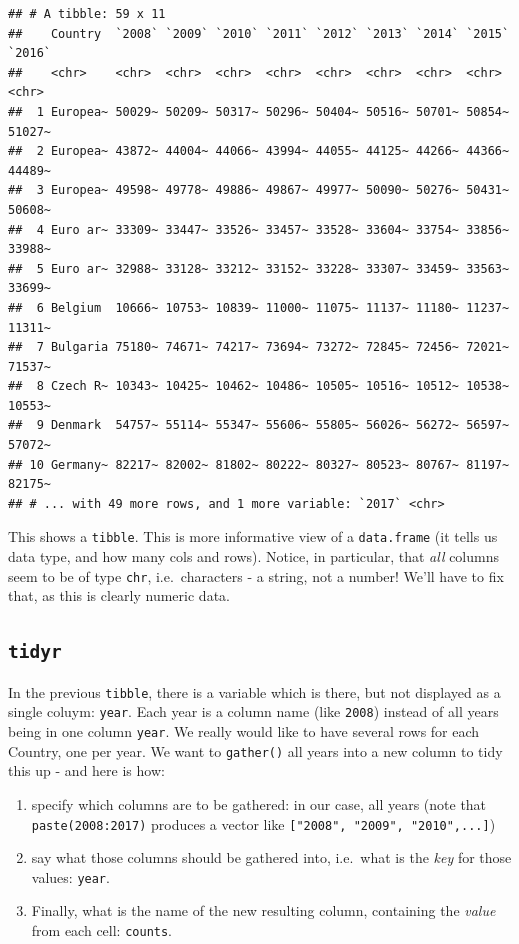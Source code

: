 \documentclass[]{book}
\providecommand{\tightlist}{%
  \setlength{\itemsep}{0pt}\setlength{\parskip}{0pt}}
\theoremstyle{definition}
\theoremstyle{definition}
\theoremstyle{definition}
\theoremstyle{remark}
\begin{document}
\begin{verbatim}
## # A tibble: 59 x 11
##    Country  `2008` `2009` `2010` `2011` `2012` `2013` `2014` `2015` `2016`
##    <chr>    <chr>  <chr>  <chr>  <chr>  <chr>  <chr>  <chr>  <chr>  <chr> 
##  1 Europea~ 50029~ 50209~ 50317~ 50296~ 50404~ 50516~ 50701~ 50854~ 51027~
##  2 Europea~ 43872~ 44004~ 44066~ 43994~ 44055~ 44125~ 44266~ 44366~ 44489~
##  3 Europea~ 49598~ 49778~ 49886~ 49867~ 49977~ 50090~ 50276~ 50431~ 50608~
##  4 Euro ar~ 33309~ 33447~ 33526~ 33457~ 33528~ 33604~ 33754~ 33856~ 33988~
##  5 Euro ar~ 32988~ 33128~ 33212~ 33152~ 33228~ 33307~ 33459~ 33563~ 33699~
##  6 Belgium  10666~ 10753~ 10839~ 11000~ 11075~ 11137~ 11180~ 11237~ 11311~
##  7 Bulgaria 75180~ 74671~ 74217~ 73694~ 73272~ 72845~ 72456~ 72021~ 71537~
##  8 Czech R~ 10343~ 10425~ 10462~ 10486~ 10505~ 10516~ 10512~ 10538~ 10553~
##  9 Denmark  54757~ 55114~ 55347~ 55606~ 55805~ 56026~ 56272~ 56597~ 57072~
## 10 Germany~ 82217~ 82002~ 81802~ 80222~ 80327~ 80523~ 80767~ 81197~ 82175~
## # ... with 49 more rows, and 1 more variable: `2017` <chr>
\end{verbatim}

This shows a \texttt{tibble}. This is more informative view of a
\texttt{data.frame} (it tells us data type, and how many cols and rows).
Notice, in particular, that \emph{all} columns seem to be of type
\texttt{chr}, i.e.~characters - a string, not a number! We'll have to
fix that, as this is clearly numeric data.

\subsection{\texorpdfstring{\texttt{tidyr}}{tidyr}}\label{tidyr}

In the previous \texttt{tibble}, there is a variable which is there, but
not displayed as a single coluym: \texttt{year}. Each year is a column
name (like \texttt{2008}) instead of all years being in one column
\texttt{year}. We really would like to have several rows for each
Country, one per year. We want to \texttt{gather()} all years into a new
column to tidy this up - and here is how:

\begin{enumerate}
\def\labelenumi{\arabic{enumi}.}
\tightlist
\item
  specify which columns are to be gathered: in our case, all years (note
  that \texttt{paste(2008:2017)} produces a vector like
  \texttt{{[}"2008",\ "2009",\ "2010",...{]}})
\item
  say what those columns should be gathered into, i.e.~what is the
  \emph{key} for those values: \texttt{year}.
\item
  Finally, what is the name of the new resulting column, containing the
  \emph{value} from each cell: \texttt{counts}.
\end{enumerate}
\end{document}
